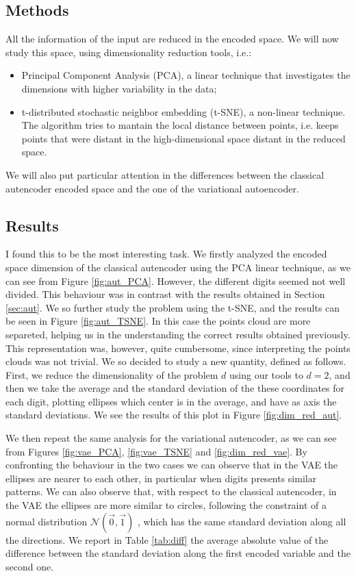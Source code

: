 \subsection{Methods}
All the information of the input are reduced in the encoded space. We will now study this space, using dimensionality reduction tools, i.e.:
\begin{itemize}
    \item Principal Component Analysis (PCA), a linear technique that investigates the dimensions with higher variability in the data;
    \item t-distributed stochastic neighbor embedding (t-SNE), a non-linear technique. The algorithm tries to mantain the local distance between points, i.e.
        keeps points that were distant in the high-dimensional space distant in the reduced space.
\end{itemize}

We will also put particular attention in the differences between the classical autencoder encoded space and the one of the variational autoencoder.

\subsection{Results}
I found this to be the most interesting task. We firstly analyzed the encoded space dimension of the classical autencoder using the PCA linear technique, as 
we can see from Figure \ref{fig:aut_PCA}. However, the different digits seemed not well divided. This behaviour was in contrast with the results obtained in 
Section \ref{sec:aut}. We so further study the problem using the t-SNE, and the results can be seen in Figure \ref{fig:aut_TSNE}. In this case the points cloud 
are more separeted, helping us in the understanding the correct results obtained previously. This representation was, however, quite cumbersome, since interpreting
the points clouds was not trivial. We so decided to study a new quantity, defined as follows. First, we reduce the dimensionality of the problem $d$ using our tools to
$d=2$, and then we take the average and the standard deviation of the these coordinates for each digit, plotting ellipses which center is in the average, and have as axis
the standard deviations. We see the results of this plot in Figure \ref{fig:dim_red_aut}.

We then repeat the same analysis for the variational autencoder, as we can see from Figures \ref{fig:vae_PCA}, \ref{fig:vae_TSNE} and \ref{fig:dim_red_vae}.
By confronting the behaviour in the two cases we can observe that in the VAE the ellipses are nearer to each other, in particular when digits presents similar patterns. We can also
observe that, with respect to the classical autencoder, in the VAE the ellipses are more similar to circles, following the constraint of a normal distribution $\mathcal{N}(\vec{0}, \vec{1})$
, which has the same  standard deviation along all the directions. We report in Table \ref{tab:diff} the average absolute value of the difference between the
 standard deviation along the first encoded variable and the second one.

